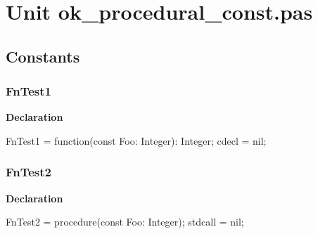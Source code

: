 \documentclass{report}
\newif\ifpdf
\begin{document}
\label{toc}\tableofcontents
\newpage
\newlength{\tmplength}
\chapter{Unit ok{\_}procedural{\_}const.pas}
\label{ok_procedural_const.pas}
\section{Constants}
\ifpdf
\subsection*{\large{\textbf{FnTest1}}\normalsize\hspace{1ex}\hrulefill}
\else
\subsection*{FnTest1}
\fi
\label{ok_procedural_const.pas-FnTest1}
\begin{list}{}{
\setlength{\itemindent}{0cm}
\setlength{\listparindent}{0cm}
\setlength{\leftmargin}{\evensidemargin}
\addtolength{\leftmargin}{\tmplength}
\settowidth{\labelsep}{X}
\addtolength{\leftmargin}{\labelsep}
\setlength{\labelwidth}{\tmplength}
}
\item[\textbf{Declaration}\hfill]
\ifpdf
\begin{flushleft}
\fi
\begin{ttfamily}
FnTest1 = function(const Foo: Integer): Integer; cdecl = nil;\end{ttfamily}

\ifpdf
\end{flushleft}
\fi

\end{list}
\ifpdf
\subsection*{\large{\textbf{FnTest2}}\normalsize\hspace{1ex}\hrulefill}
\else
\subsection*{FnTest2}
\fi
\label{ok_procedural_const.pas-FnTest2}
\begin{list}{}{
\setlength{\itemindent}{0cm}
\setlength{\listparindent}{0cm}
\setlength{\leftmargin}{\evensidemargin}
\addtolength{\leftmargin}{\tmplength}
\settowidth{\labelsep}{X}
\addtolength{\leftmargin}{\labelsep}
\setlength{\labelwidth}{\tmplength}
}
\item[\textbf{Declaration}\hfill]
\ifpdf
\begin{flushleft}
\fi
\begin{ttfamily}
FnTest2 = procedure(const Foo: Integer); stdcall = nil;\end{ttfamily}

\ifpdf
\end{flushleft}
\fi

\end{list}
\end{document}
